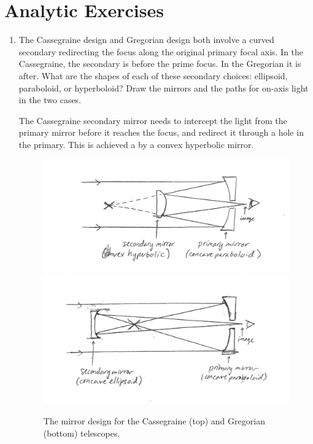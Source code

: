 \section{Analytic Exercises}

\begin{enumerate}
\item The Cassegraine design and Gregorian design both involve a
curved secondary redirecting the focus along the original primary
focal axis. In the Cassegraine, the secondary is before the prime
focus. In the Gregorian it is after. What are the shapes of each of
these secondary choices: ellipsoid, paraboloid, or hyperboloid? Draw
the mirrors and the paths for on-axis light in the two cases.

\begin{answer}
The Cassegraine secondary mirror needs to intercept the light from the
primary mirror before it reaches the focus, and redirect it through a
hole in the primary. This is achieved a by a convex hyperbolic mirror.

\begin{figure}[!h]	
\includegraphics[width=1\columnwidth]{figures/cassegraine.jpg}
\includegraphics[width=1\columnwidth]{figures/gregorian.jpg}
\caption{The mirror design for the Cassegraine (top) and Gregorian
(bottom) telescopes.}
\label{fig:cassgreg}
\end{figure}


\end{answer}
\end{enumerate}
